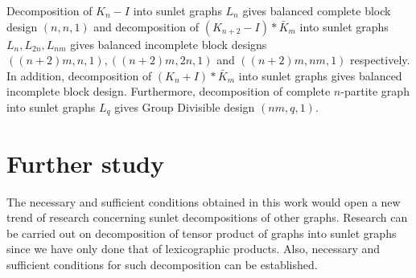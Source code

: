 \documentclass[12pt]{report}
\begin{document}
Decomposition of $K_n-I$ into sunlet graphs $L_n$ gives
balanced complete block design $(n,n,1)$ and decomposition of
$(K_{n+2}-I)*\bar{K}_m$ into sunlet graphs $L_n,L_{2n},L_{nm}$ gives
balanced incomplete block designs $((n+2)m,n,1),((n+2)m,2n,1)$ and
$((n+2)m,nm,1)$ respectively. In addition, decomposition of
$(K_{n}+I)*\bar{K}_m$ into sunlet graphs gives balanced incomplete
block design. Furthermore, decomposition of complete $n$-partite
graph into sunlet graphs $L_q$ gives Group Divisible design
$(nm,q,1)$.\\

\section{Further study}
The necessary and sufficient conditions
obtained in this work would open a new trend of research concerning sunlet decompositions of other graphs.
Research can be carried out on decomposition of tensor product of graphs into sunlet graphs since we have only done that of lexicographic products. Also, necessary and sufficient conditions for such decomposition can be established.
\end{document}
